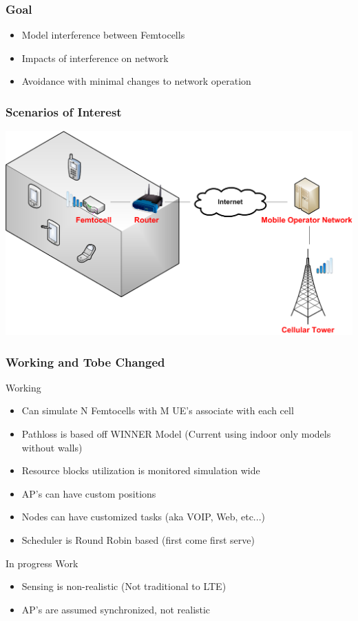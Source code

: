 \documentclass{beamer}
\begin{document}
\begin{frame}
\frametitle{Goal}
\begin{itemize}
  \item Model interference between Femtocells
  \item Impacts of interference on network
  \item Avoidance with minimal changes to network operation
\end{itemize}
\end{frame}


\begin{frame}
\frametitle{Scenarios of Interest}
\centering
\includegraphics[width=0.8\linewidth]{images/femto.png}
\end{frame}


\begin{frame}
\frametitle{Working and Tobe Changed}

\begin{block}{Working}
\begin{itemize}
  \item Can simulate N Femtocells with M UE's associate with each cell
  \item Pathloss is based off WINNER Model (Current using indoor only models without walls)
  \item Resource blocks utilization is monitored simulation wide
  \item AP's can have custom positions
  \item Nodes can have customized tasks (aka VOIP, Web, etc...)
  \item Scheduler is Round Robin based (first come first serve)
\end{itemize}
\end{block}

\begin{block}{In progress Work}
  \begin{itemize}
    \item Sensing is non-realistic (Not traditional to LTE)
    \item AP's are assumed synchronized, not realistic
  \end{itemize}
\end{block}

\end{frame}
\end{document}
